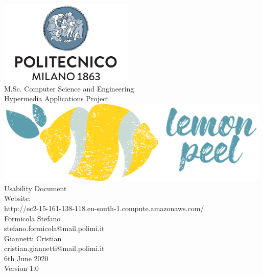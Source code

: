 \documentclass{report}
\begin{document}
	\begin{titlepage}
		\centering
		\vfill
		{
			\includegraphics[width =\linewidth, height = 4cm, keepaspectratio]{PolitecnicoLogo.png}
			\label{fig:PolitecnicoLogo}
			\large \\[2ex]M.Sc. Computer Science and Engineering\\
			\large Hypermedia Applications Project\\[12ex]
			\includegraphics[width =\linewidth, height = 4cm, keepaspectratio]{LemonPeelLogo.png}\\[12ex]

			\huge Usability Document\\[1.5ex]

			\normalsize Website:\\
				 http://ec2-15-161-138-118.eu-south-1.compute.amazonaws.com/\\[1.5ex]
			\normalsize Formicola Stefano\\[0.5ex]
			\normalsize stefano.formicola@mail.polimi.it\\[1.5ex]
			\normalsize Giannetti Cristian\\[0.5ex]
			\normalsize cristian.giannetti@mail.polimi.it\\[1.5ex]
			\normalsize 6th June 2020\\[1.5ex]
			\normalsize Version 1.0
		}

	\end{titlepage}

	\newpage

	
	\addtocounter{page}{1}

	\clearpage
	\tableofcontents
	\thispagestyle{fancy}
	
	\newpage
	
	
	
	
	
	\thispagestyle{fancy}
	
\end{document}
